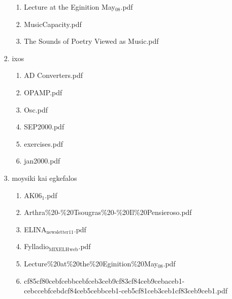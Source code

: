 \documentclass[11pt]{article}
\begin{document}
\begin{enumerate}
\begin{enumerate}
\begin{enumerate}
\begin{enumerate}
\item Lecture at the Eginition May$_{\text{08}}$.pdf
\label{sec-1-1-1-1-49-2-2-1-73-7-5}

\item MusicCapacity.pdf
\label{sec-1-1-1-1-49-2-2-1-73-7-6}

\item The Sounds of Poetry Viewed as Music.pdf
\label{sec-1-1-1-1-49-2-2-1-73-7-7}
\end{enumerate}

\item ixos
\label{sec-1-1-1-1-49-2-2-1-73-8}
\begin{enumerate}
\item AD Converters.pdf
\label{sec-1-1-1-1-49-2-2-1-73-8-1}

\item OPAMP.pdf
\label{sec-1-1-1-1-49-2-2-1-73-8-2}

\item Osc.pdf
\label{sec-1-1-1-1-49-2-2-1-73-8-3}

\item SEP2000.pdf
\label{sec-1-1-1-1-49-2-2-1-73-8-4}

\item exercises.pdf
\label{sec-1-1-1-1-49-2-2-1-73-8-5}

\item jan2000.pdf
\label{sec-1-1-1-1-49-2-2-1-73-8-6}
\end{enumerate}

\item moysiki kai egkefalos
\label{sec-1-1-1-1-49-2-2-1-73-9}
\begin{enumerate}
\item AK06$_{\text{1}}$.pdf
\label{sec-1-1-1-1-49-2-2-1-73-9-1}

\item Arthra\%20-\%20Tsougras\%20-\%20Il\%20Pensieroso.pdf
\label{sec-1-1-1-1-49-2-2-1-73-9-2}

\item ELINA$_{\text{newsletter11}}$.pdf
\label{sec-1-1-1-1-49-2-2-1-73-9-3}

\item Fylladio$_{\text{MIXELH}}$$_{\text{web}}$.pdf
\label{sec-1-1-1-1-49-2-2-1-73-9-4}

\item Lecture\%20at\%20the\%20Eginition\%20May$_{\text{08}}$.pdf
\label{sec-1-1-1-1-49-2-2-1-73-9-5}

\item cf85cf80cebfcebbcebfceb3ceb9cf83cf84ceb9cebaceb1-cebccebfcebdcf84ceb5cebbceb1-ceb5cf81ceb3ceb1cf83ceb9ceb1.pdf
\label{sec-1-1-1-1-49-2-2-1-73-9-6}
\end{enumerate}


\end{enumerate}
\end{enumerate}
\end{enumerate}
\end{document}
